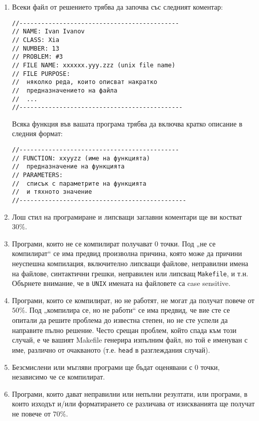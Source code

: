 \documentclass[a4paper,10pt]{article}
\begin{document}
\begin{enumerate}
			\item Всеки файл от решението трябва да започва със следният коментар:

				\begin{verbatim}
//--------------------------------------------
// NAME: Ivan Ivanov
// CLASS: Xia
// NUMBER: 13
// PROBLEM: #3
// FILE NAME: xxxxxx.yyy.zzz (unix file name)
// FILE PURPOSE:
// 	няколко реда, които описват накратко
// 	предназначението на файла
// 	...
//--------------------------------------------- 
				\end{verbatim}
	
				Всяка функция във вашата програма трябва да включва кратко описание в следния формат:

				\begin{verbatim}
//--------------------------------------------
// FUNCTION: xxyyzz (име на функцията)
// 	предназначение на функцията
// PARAMETERS:
// 	списък с параметрите на функцията
// 	и тяхното значение
//----------------------------------------------
				\end{verbatim}

			\item Лош стил на програмиране и липсващи заглавни коментари ще ви костват $30\%$.
			
			\item Програми, които не се компилират получават 0 точки. Под „не се компилират“ се има предвид произволна причина, 
			която може да причини неуспешна компилация, включително липсващи файлове, неправилни имена на файлове, синтактични 
			грешки, неправилен или липсващ  \verb|Makefile|, и т.н. Обърнете внимание, че в \verb|UNIX| имената на файловете 
			са case sensitive.
			
			\item Програми, които се компилират, но не работят, не могат да получат повече от $50\%$. Под „компилира се, но не 
			работи“ се има предвид, че вие сте се опитали да решите проблема до известна степен, но не сте успели да направите 
			пълно решение. Често срещан проблем, който спада към този случай, е че вашият  Makefile генерира изпълним файл, но 
			той е именуван с име, различно от очакваното (т.е. \verb|head| в разглеждания случай).
			
			\item Безсмислени или мъгляви програми ще бъдат оценявани с 0 точки, независимо че се компилират.
			
			\item Програми, които дават неправилни или непълни резултати, или програми, в които изходът и/или форматирането се 
			различава от изискванията ще получат не повече от $70\%$.
			

\end{enumerate}
\end{document}

